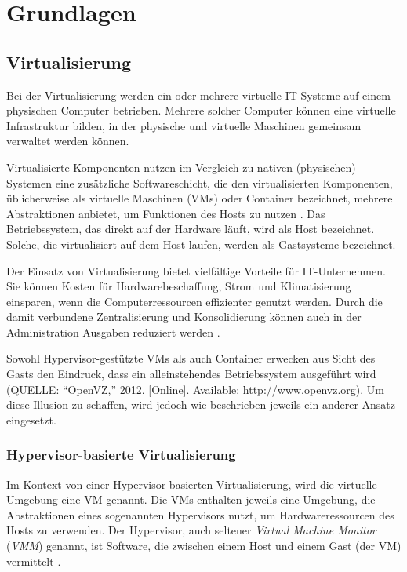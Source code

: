 \documentclass[../main.tex]{subfiles}
\begin{document}
\chapter{Grundlagen}
\label{basics}

	\section{Virtualisierung}
  \label{introVirt}
    Bei der Virtualisierung werden ein oder mehrere virtuelle \acrshort{IT}-Systeme auf einem physischen Computer betrieben. Mehrere solcher Computer können eine virtuelle Infrastruktur bilden, in der physische und virtuelle Maschinen gemeinsam verwaltet werden können.

		Virtualisierte Komponenten nutzen im Vergleich zu nativen (physischen) Systemen eine zusätzliche Softwareschicht, die den virtualisierten Komponenten, üblicherweise als virtuelle Maschinen (\acrshort{VM}s) oder Container bezeichnet, mehrere Abstraktionen anbietet, um Funktionen des Hosts zu nutzen \cite[S.2]{containerVirtPerformance}. Das Betriebssystem, das direkt auf der Hardware läuft, wird als Host bezeichnet. Solche, die virtualisiert auf dem Host laufen, werden als Gastsysteme bezeichnet.

    Der Einsatz von Virtualisierung bietet vielfältige Vorteile für \acrshort{IT}-Unternehmen. Sie können Kosten für Hardwarebeschaffung, Strom und Klimatisierung einsparen, wenn die Computerressourcen effizienter genutzt werden. Durch die damit verbundene Zentralisierung und Konsolidierung können auch in der Administration Ausgaben reduziert werden  \cite[S.1]{bsiVirt}.

	  Sowohl Hypervisor-gestützte VMs als auch Container erwecken aus Sicht des Gasts den Eindruck, dass ein alleinstehendes Betriebssystem ausgeführt wird (QUELLE: “OpenVZ,” 2012. [Online]. Available: http://www.openvz.org). Um diese Illusion zu schaffen, wird jedoch wie beschrieben jeweils ein anderer Ansatz eingesetzt.

    \subsection{Hypervisor-basierte Virtualisierung}
    \label{introVirtHypervisor}
      Im Kontext von einer Hypervisor-basierten Virtualisierung, wird die virtuelle Umgebung eine \acrshort{VM} genannt. Die \acrshort{VM}s enthalten jeweils eine Umgebung, die Abstraktionen eines sogenannten Hypervisors nutzt, um Hardwareressourcen des Hosts zu verwenden. Der Hypervisor, auch seltener \emph{Virtual Machine Monitor} (\emph{VMM}) genannt, ist Software, die zwischen einem Host und einem Gast (der \acrshort{VM}) vermittelt \cite[S.6]{dockerBook}\cite[S.2]{containerVirtPerformance}\cite[S.2]{dockerSec1}.
\end{document}
